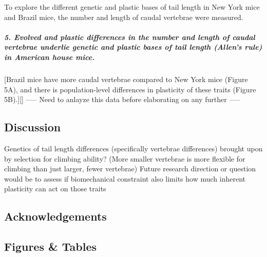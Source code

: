 \documentclass[]{article}
\let\oldsubparagraph\subparagraph
\renewcommand{\subparagraph}[1]{\oldsubparagraph{#1}\mbox{}}
\begin{document}
To explore the different genetic and plastic bases of tail length in New
York mice and Brazil mice, the number and length of caudal vertebrae
were measured.

\hypertarget{evolved-and-plastic-differences-in-the-number-and-length-of-caudal-vertebrae-underlie-genetic-and-plastic-bases-of-tail-length-allens-rule-in-american-house-mice.}{%
\subparagraph{\texorpdfstring{\textbf{5. Evolved and plastic differences
in the number and length of caudal vertebrae underlie genetic and
plastic bases of tail length (Allen's rule) in American house
mice.}}{5. Evolved and plastic differences in the number and length of caudal vertebrae underlie genetic and plastic bases of tail length (Allen's rule) in American house mice.}}\label{evolved-and-plastic-differences-in-the-number-and-length-of-caudal-vertebrae-underlie-genetic-and-plastic-bases-of-tail-length-allens-rule-in-american-house-mice.}}

{[}Brazil mice have more caudal vertebrae compared to New York mice
(Figure 5A), and there is population-level differences in plasticity of
these traits (Figure 5B).{]}{[}{]} ----- Need to anlayze this data
before elaborating on any further -----

\newpage

\hypertarget{discussion}{%
\subsection{Discussion}\label{discussion}}

Genetics of tail length differences (specifically vertebrae differences)
brought upon by selection for climbing ability? (More smaller vertebrae
is more flexible for climbing than just larger, fewer vertebrae) Future
research direction or question would be to assess if biomechanical
constraint also limits how much inherent plasticity can act on those
traits

\newpage

\hypertarget{acknowledgements}{%
\subsection{Acknowledgements}\label{acknowledgements}}

\newpage

\hypertarget{figures-tables}{%
\subsection{Figures \& Tables}\label{figures-tables}}
\end{document}
